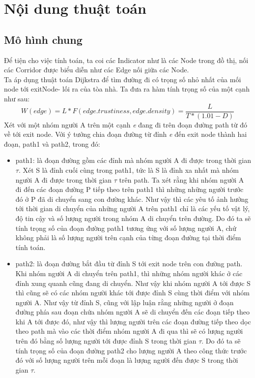 \section{Nội dung thuật toán}
    \subsection{Mô hình chung}
    Để tiện cho việc tính toán, ta coi các Indicator như là các Node 
    trong đồ thị, nối các Corridor được biểu diễn như các Edge nối giữa
    các Node. \\ 
    Ta áp dụng thuật toán Dijkstra để tìm đường đi có trọng số nhỏ nhất 
    của mối node tới exitNode- lối ra của tòa nhà. Ta đưa ra hàm tính 
    trọng số của một cạnh như sau: 
    \begin{equation}
        W(edge) = L * F(edge.trustiness, edge.density) = \frac{L}{T * (1.01 - D)}
    \end{equation}
    Xét với một nhóm người A trên một cạnh \emph{e} đang đi trên đoạn đường path từ
    đó về tới exit node.
    Với ý tưởng chia đoạn đường từ đỉnh \emph{e} đến exit node thành hai đoạn, path1 và
    path2, trong đó: 
    \begin{itemize}
        \item path1: là đoạn đường gồm các đỉnh mà nhóm người A đi được trong thời gian 
        $\tau$. Xét S là đỉnh cuối cùng trong path1, tức là S là đỉnh xa nhất mà nhóm 
        người A đi được trong thời gian $\tau$ trên path. Ta xét rằng khi nhóm người A
        đi đến các đoạn đường P tiếp theo trên path1 thì những những người trước đó ở P
        đã di chuyển sang con đường khác. Như vậy thì các yêu tố ảnh hưởng tới thời gian 
        di chuyển của những người A trên path1 chỉ là các yếu tố vật lý, độ tin cậy và
        số lượng người trong nhóm A di chuyển trên đường. Do đó ta sẽ tính trọng số của 
        đoạn đường path1 tương ứng với số lượng người A, chứ không phải là số lượng người 
        trên cạnh của từng đoạn đường tại thời điểm tính toán.
        \item path2: là đoạn đường bắt đầu từ đỉnh S tới exit node trên con đường path.
        Khi nhóm người A di chuyển trên path1, thì những nhóm người khác ở các đỉnh xung 
        quanh cũng đang di chuyển. Như vậy khi nhóm người A tới được S thì cũng sẽ có các
        nhóm người khác tới được đỉnh S cùng thời điểm với nhóm người A. Như vậy từ đỉnh S,
        cũng với lập luận rằng những người ở đoạn đường phía sau đoạn chứa nhóm người A
        sẽ di chuyển đến các đoạn tiếp theo khi A tới được đó, như vậy thì
        lượng người trên các đoạn đường tiếp theo dọc theo path mà vào các thời điểm 
        nhóm người A đi qua thì sẽ có lượng người trên đó bằng số lượng người tới được 
        đỉnh S trong thời gian $\tau$. Do đó ta sẽ tính trọng số của đoạn đường path2 
        cho lượng người A theo công thức trước đó với số lượng người trên mỗi đoạn là 
        lượng người đến được S trong thời gian $\tau$.
    \end{itemize}
